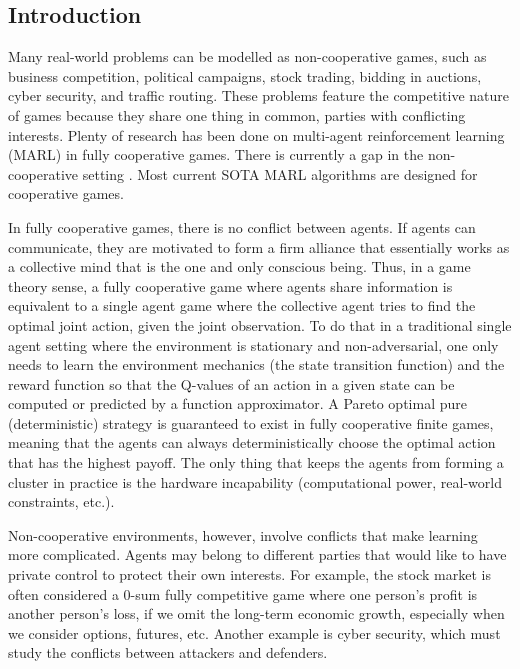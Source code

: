 \documentclass[a4paper]{article}
\begin{document}
\begin{multicols}{2}
\setlength{\columnsep}{0.5cm}

\section{Introduction}
Many real-world problems can be modelled as non-cooperative games, such as business competition, political campaigns, stock trading, bidding in auctions, cyber security, and traffic routing. These problems feature the competitive nature of games because they share one thing in common, parties with conflicting interests. Plenty of research has been done on multi-agent reinforcement learning (MARL) in fully cooperative games. There is currently a gap in the non-cooperative setting \cite{zhu2024survey}. Most current SOTA MARL algorithms are designed for cooperative games.

In fully cooperative games, there is no conflict between agents. If agents can communicate, they are motivated to form a firm alliance that essentially works as a collective mind that is the one and only conscious being. Thus, in a game theory sense, a fully cooperative game where agents share information is equivalent to a single agent game where the collective agent tries to find the optimal joint action, given the joint observation. To do that in a traditional single agent setting where the environment is stationary and non-adversarial, one only needs to learn the environment mechanics (the state transition function) and the reward function so that the Q-values of an action in a given state can be computed or predicted by a function approximator. A Pareto optimal pure (deterministic) strategy is guaranteed to exist in fully cooperative finite games, meaning that the agents can always deterministically choose the optimal action that has the highest payoff. The only thing that keeps the agents from forming a cluster in practice is the hardware incapability (computational power, real-world constraints, etc.).

Non-cooperative environments, however, involve conflicts that make learning more complicated. Agents may belong to different parties that would like to have private control to protect their own interests. For example, the stock market is often considered a 0-sum fully competitive game where one person's profit is another person's loss, if we omit the long-term economic growth, especially when we consider options, futures, etc. Another example is cyber security, which must study the conflicts between attackers and defenders.


\end{multicols}
\end{document}
